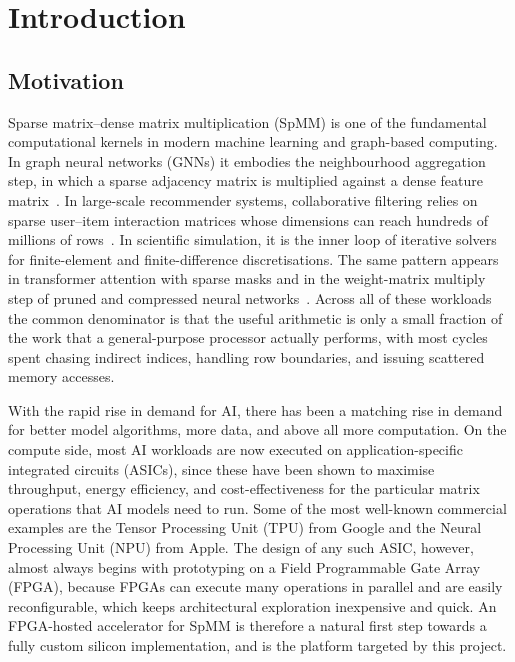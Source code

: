 \chapter{Introduction}
\label{ch:introduction}

\section{Motivation}

Sparse matrix--dense matrix multiplication (SpMM) is one of the fundamental
computational kernels in modern machine learning and graph-based computing.
In graph neural networks (GNNs) it embodies the neighbourhood aggregation
step, in which a sparse adjacency matrix is multiplied against a dense
feature matrix~\citep{graphsage2017, gat2018}. In large-scale recommender
systems, collaborative filtering relies on sparse user--item interaction
matrices whose dimensions can reach hundreds of millions of
rows~\citep{covington2016youtube}. In scientific simulation, it is the
inner loop of iterative solvers for finite-element and finite-difference
discretisations. The same pattern appears in transformer attention with
sparse masks and in the weight-matrix multiply step of pruned and
compressed neural networks~\citep{han2016eie}. Across all of these
workloads the common denominator is that the useful arithmetic is only
a small fraction of the work that a general-purpose processor actually
performs, with most cycles spent chasing indirect indices, handling row
boundaries, and issuing scattered memory accesses.

With the rapid rise in demand for AI, there has been a matching rise in
demand for better model algorithms, more data, and above all more computation.
On the compute side, most AI workloads are now executed on
application-specific integrated circuits (ASICs), since these have been shown to
maximise throughput, energy efficiency, and cost-effectiveness for the
particular matrix operations that AI models need to run. Some of the most
well-known commercial examples are the Tensor Processing Unit (TPU) from
Google and the Neural Processing Unit (NPU) from Apple. The design of any
such ASIC, however, almost always begins with prototyping on a Field
Programmable Gate Array (FPGA), because FPGAs can execute many operations
in parallel and are easily reconfigurable, which keeps architectural
exploration inexpensive and quick. An
FPGA-hosted accelerator for SpMM is therefore a natural first step towards
a fully custom silicon implementation, and is the platform targeted by
this project.

